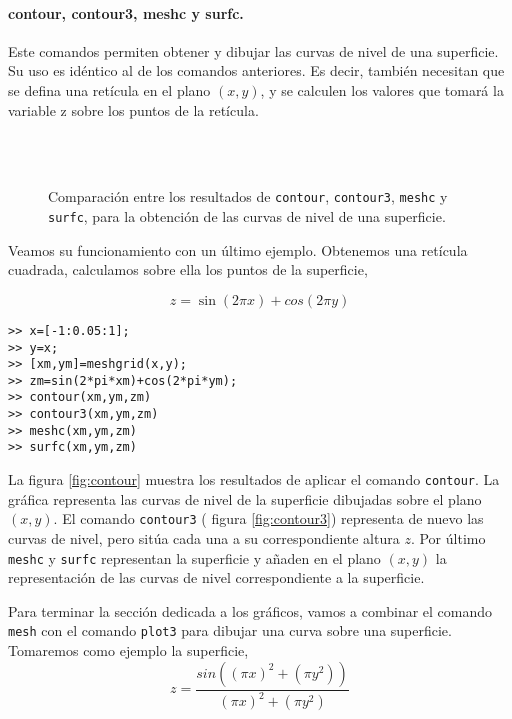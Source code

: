 \paragraph{contour, contour3, meshc y surfc.} Este comandos permiten obtener y dibujar las curvas de nivel de una superficie. Su uso es idéntico al de los comandos anteriores. Es decir, también necesitan que se defina una retícula en el plano $(x,y)$, y se calculen los valores que tomará  la variable z sobre los puntos de la retícula.

\begin{figure}
\centering
{} \qquad 
{}\\
\qquad
{}\\
\caption{Comparación entre los resultados de \texttt{contour}, \texttt{contour3}, \texttt{meshc} y \texttt{surfc}, para la obtención de las curvas de nivel de una superficie. }
\end{figure}

Veamos su funcionamiento con un último ejemplo. Obtenemos una retícula cuadrada, calculamos sobre ella los puntos de la superficie,

\begin{equation*}
z=\sin(2\pi x)+cos(2\pi y)
\end{equation*}

\begin{verbatim}
>> x=[-1:0.05:1];
>> y=x;
>> [xm,ym]=meshgrid(x,y);
>> zm=sin(2*pi*xm)+cos(2*pi*ym);
>> contour(xm,ym,zm)
>> contour3(xm,ym,zm)
>> meshc(xm,ym,zm)
>> surfc(xm,ym,zm)
\end{verbatim}



La figura \ref{fig:contour} muestra los resultados de aplicar el comando \texttt{contour}. La gráfica representa las curvas de nivel de la superficie dibujadas sobre el plano $(x,y)$. El comando \texttt{contour3} ( figura \ref{fig:contour3}) representa de nuevo las curvas de nivel, pero sitúa cada una a su correspondiente altura $z$.  Por último \texttt{meshc} y \texttt{surfc} representan la superficie y añaden en el plano $(x,y)$ la representación de las curvas de nivel correspondiente a la superficie.

Para terminar la sección dedicada a los gráficos, vamos a combinar el comando \texttt{mesh} con el comando \texttt{plot3} para dibujar una curva sobre una superficie. Tomaremos como ejemplo la superficie,
\begin{equation*}
z=\frac{sin\left((\pi x)^2+(\pi y^2)\right)}{(\pi x)^2+(\pi y^2)}
\end{equation*}

